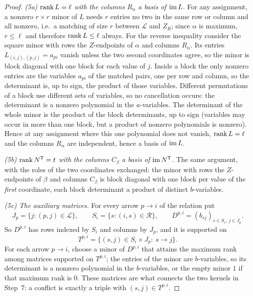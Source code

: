 \begin{proof}
\emph{(5a) $\operatorname{rank} L=\ell$ with the columns $R_\alpha$ a basis of $\operatorname{im} L$.} For any assignment, a
nonzero $r\times r$ minor of $L$ needs $r$ entries no two in the same row or column and all nonzero,
i.e.\ a matching of size $r$ between $\mathcal L$ and $Z_R$; since $\alpha$ is maximum, $r\le\ell$ and
therefore $\operatorname{rank} L\le\ell$ always. For the reverse inequality consider the square minor with rows the
$Z$-endpoints of $\alpha$ and columns $R_\alpha$. Its entries $L_{(i,j),(p,j)}=a_{pi}$ vanish unless
the two second coordinates agree, so the minor is block diagonal with one block for each value of $j$.
Inside a block the only nonzero entries are the variables $a_{pi}$ of the matched pairs, one per row
and column, so the determinant is, up to sign, the product of those variables. Different permutations
of a block use different sets of variables, so no cancellation occurs: the determinant is a nonzero
polynomial in the $a$-variables. The determinant of the whole minor is the product of the block
determinants, up to sign (variables may occur in more than one block, but a product of nonzero
polynomials is nonzero). Hence at any assignment where this one polynomial does not vanish,
$\operatorname{rank} L=\ell$ and the columns $R_\alpha$ are independent, hence a basis of $\operatorname{im} L$.

\emph{(5b) $\operatorname{rank} N^{\mathsf T}=t$ with the columns $C_\beta$ a basis of $\operatorname{im} N^{\mathsf T}$.} The same
argument, with the roles of the two coordinates exchanged: the minor with rows the $Z$-endpoints of
$\beta$ and columns $C_\beta$ is block diagonal with one block per value of the \emph{first}
coordinate, each block determinant a product of distinct $b$-variables.

\emph{(5c) The auxiliary matrices.} For every arrow $p\to i$ of the relation put
\begin{equation}\label{eq:Dpi}
 J_p=\{j:(p,j)\in\mathcal L\},\qquad S_i=\{s:(i,s)\in\mathcal R\},
 \qquad D^{p,i}=(b_{sj})_{s\in S_i,\ j\in J_p} .
\end{equation}
So $D^{p,i}$ has rows indexed by $S_i$ and columns by $J_p$, and it is supported on
\begin{equation}\label{eq:Tpi}
 T^{p,i}=\{(s,j)\in S_i\times J_p:\ s\to j\}.
\end{equation}
For each arrow $p\to i$, choose a minor of $D^{p,i}$ that attains the maximum rank among matrices
supported on $T^{p,i}$; the entries of the minor are $b$-variables, so its determinant is a nonzero
polynomial in the $b$-variables, or the empty minor $1$ if that maximum rank is $0$. These matrices
are what connects the two kernels in Step~7: a conflict is exactly a triple with $(s,j)\in T^{p,i}$.


\end{proof}
